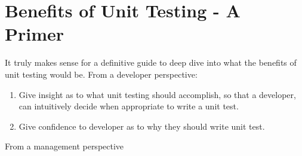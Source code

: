 \maketitle{}
\section{ Benefits of Unit Testing - A Primer }
It truly makes sense for a definitive guide to deep dive into what the benefits
of unit testing would be. From a developer perspective:
\begin{enumerate}
  \item Give insight as to what unit testing should accomplish, so that a
  developer, can intuitively decide when appropriate to write a unit test.
  \item Give confidence to developer as to why they should write unit test.
\end{enumerate}

From a management perspective
